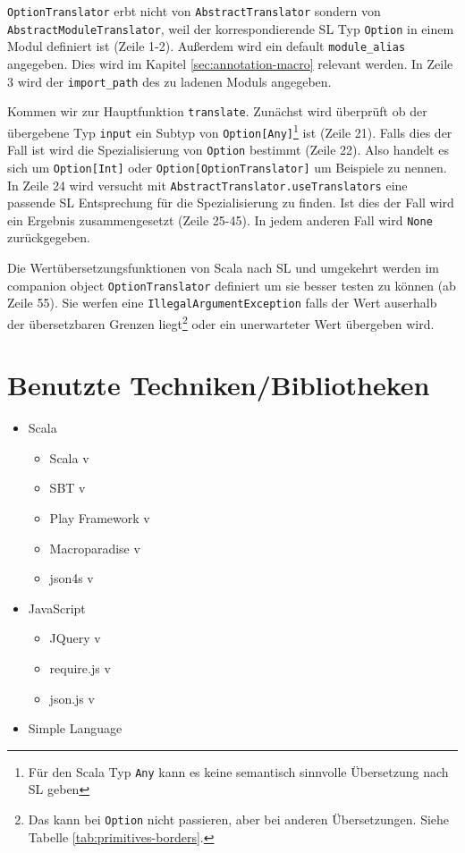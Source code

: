 \documentclass[12pt]{scrreprt}
\begin{document}
\lstinline!OptionTranslator! erbt nicht von \lstinline!AbstractTranslator! sondern von \lstinline!AbstractModuleTranslator!, weil der korrespondierende \ac{SL} Typ \lstinline!Option! in einem Modul definiert ist (Zeile 1-2). Außerdem wird ein default \lstinline!module_alias! angegeben. Dies wird im Kapitel \ref{sec:annotation-macro} relevant werden. In Zeile 3 wird der \lstinline!import_path! des zu ladenen Moduls angegeben. 

Kommen wir zur Hauptfunktion \lstinline!translate!. Zunächst wird überprüft ob der übergebene Typ \lstinline!input! ein Subtyp von \lstinline!Option[Any]!\footnote{Für den Scala Typ \lstinline!Any! kann es keine semantisch sinnvolle Übersetzung nach \ac{SL} geben} ist (Zeile 21). Falls dies der Fall ist wird die Spezialisierung von \lstinline!Option! bestimmt (Zeile 22). Also handelt es sich um \lstinline!Option[Int]! oder \lstinline!Option[OptionTranslator]! um Beispiele zu nennen. In Zeile 24 wird versucht mit \lstinline!AbstractTranslator.useTranslators! eine passende \ac{SL} Entsprechung für die Spezialisierung zu finden. Ist dies der Fall wird ein Ergebnis zusammengesetzt (Zeile 25-45). In jedem anderen Fall wird \lstinline!None! zurückgegeben.

Die Wertübersetzungsfunktionen von Scala nach \ac{SL} und umgekehrt werden im companion object \lstinline!OptionTranslator! definiert um sie besser testen zu können (ab Zeile 55). Sie werfen eine \lstinline!IllegalArgumentException! falls der Wert auserhalb der übersetzbaren Grenzen liegt\footnote{Das kann bei \lstinline!Option! nicht passieren, aber bei anderen Übersetzungen. Siehe Tabelle \ref{tab:primitives-borders}.} oder ein unerwarteter Wert übergeben wird.

\section{Benutzte Techniken/Bibliotheken}

\begin{itemize}
  \item{Scala}
  \begin{itemize}
    \item{Scala v}
    \item{SBT v}
    \item{Play Framework v}
    \item{Macroparadise v}
    \item{json4s v}
  \end{itemize}
  \item{JavaScript}
  \begin{itemize}
    \item{JQuery v}
    \item{require.js v}
    \item{json.js v}
  \end{itemize}
  \item{Simple Language}
\end{itemize}
\end{document}
